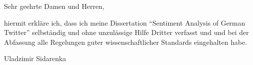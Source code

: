 \documentclass[12pt]{dinbrief}
\newcommand{\wowa}{Uladzimir Sidarenka}
\newcommand{\sgdh}{Sehr geehrte Damen und Herren}
\begin{document}
\begin{letter}
  \addresshigh
  \nowindowrules %
  \nobackaddressrule %

  \date{\today}
  \subject{\textbf{Erkl\"arung \"uber selbst\"andige Anfertigung der
      Dissertation}}
  \opening{\sgdh,}

  hiermit erkl\"are ich, dass ich meine Dissertation ``Sentiment
  Analysis of German Twitter'' selbst\"andig und ohne unzul\"assige
  Hilfe Dritter verfasst und und bei der Abfassung alle Regelungen
  guter wissenschaftlicher Standards eingehalten habe.

  \bigskip
  \hfill\wowa
\end{letter}
\end{document}
